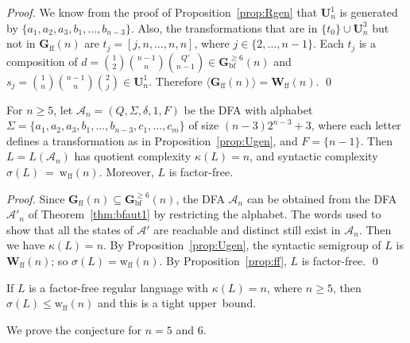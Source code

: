 \documentclass{llncs}
\renewcommand{\le}{\leqslant}
\renewcommand{\ge}{\geqslant}
\newcommand{\Sig}{\Sigma}
\newcommand{\cA}{{\mathcal A}}
\newcommand{\Wff}{\mathbf{W}_{\mathrm{ff}}}
\newcommand{\Hbf}{\mathbf{G}^{\ge 6}_{\mathrm{bf}}}
\newcommand{\Hff}{\mathbf{G}_{\mathrm{ff}}}
\newcommand{\Uf}{\mathbf{U}}
\newcommand{\wff}{{\mathrm{w}_{\mathrm{ff}}}}
\begin{document}
\begin{proof} 
We know from the proof of Proposition~\ref{prop:Rgen} that $\Uf^1_n$ is generated by $\{a_1,a_2,a_3,b_1,\ldots,b_{n-3}\}$. Also, the transformations that are in $\{t_0\} \cup \Uf^3_n$ but not in $\Hff(n)$ are $t_j = [j,n,\ldots,n,n]$, where $j \in \{2,\ldots,n-1\}$. Each $t_j$ is a composition of $d = {1 \choose 2}{n-1 \choose n}{Q' \choose n-1} \in \Hbf(n)$ and $s_j = {1 \choose n}{n-1 \choose n}{2 \choose j} \in \Uf^1_n$. Therefore $\langle \Hff(n) \rangle = \Wff(n)$. \qed
\end{proof}

\begin{theorem}\label{thm:ffaut} 
For $n \ge 5$, let $\cA_n = (Q, \Sig, \delta, 1, F)$ be the DFA with alphabet $\Sig = \{a_1, a_2, a_3, b_1, \ldots, b_{n-3}, c_1, \ldots, c_m\}$ of size $(n-3)2^{n-3}+3$, where each letter defines a transformation as in Proposition~\ref{prop:Ugen}, and $F = \{n-1\}$. Then $L = L(\cA_n)$ has quotient complexity $\kappa(L) = n$, and syntactic complexity $\sigma(L)~=~\wff(n)$. Moreover, $L$ is factor-free. 
\end{theorem}

\begin{proof} 
Since $\Hff(n) \subseteq \Hbf(n)$, the DFA $\cA_n$ can be obtained from the DFA $\cA'_n$ of Theorem~\ref{thm:bfaut1} by restricting the alphabet. The words used to show that all the states of $\cA'$ are reachable and distinct still exist in $\cA_n$. Then we have $\kappa(L) = n$. By Proposition~\ref{prop:Ugen}, the syntactic semigroup of $L$ is $\Wff(n)$; so $\sigma(L) = \wff(n)$. By Proposition~\ref{prop:ff}, $L$ is factor-free. \qed
\end{proof}

\begin{conjecture}\label{con:ff}
If $L$ is a factor-free regular language with $\kappa(L) = n$, where $n \ge 5$, then $\sigma(L) \le \wff(n)$ and this is a tight upper~bound. 
\end{conjecture}

We prove the conjecture for $n = 5$ and $6$. 
\end{document}
